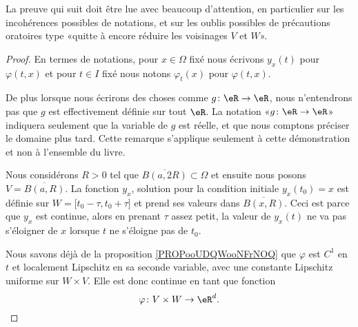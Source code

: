 \begin{probleme}
    La preuve qui suit doit être lue avec beaucoup d'attention, en particulier sur les incohérences possibles de notations, et sur les oublis possibles de précautions oratoires type «quitte à encore réduire les voisinages \( V\) et $W$».
\end{probleme}

\begin{proof}
    En termes de notations, pour \( x\in \Omega \) fixé nous écrivons \( y_x(t)\) pour \( \varphi(t,x)\) et pour \( t\in I\) fixé nous notons \( \varphi_t(x)\) pour \( \varphi(t,x)\).

    De plus lorsque nous écrirons des choses comme \( g\colon \eR\to \eR\), nous n'entendrons pas que \( g\) est effectivement définie sur tout \( \eR\). La notation «\( g\colon \eR\to \eR\)» indiquera seulement que la variable de \( g\) est réelle, et que nous comptons préciser le domaine plus tard. Cette remarque s'applique seulement à cette démonstration et non à l'ensemble du livre.

    Nous considérons \( R>0\) tel que \( \overline{ B(a,2R) }\subset\Omega\) et ensuite nous posons \( V=\overline{ B(a,R) }\). La fonction \( y_x\), solution pour la condition initiale \( y_x(t_0)=x\) est définie sur \( W=\mathopen[ t_0-\tau , t_0+\tau  \mathclose]\) et prend ses valeurs dans \( \overline{ B(x,R) }\). Ceci est parce que \( y_x\) est continue, alors en prenant \( \tau\) assez petit, la valeur de \( y_x(t)\) ne va pas s'éloigner de \( x\) lorsque \( t\) ne s'éloigne pas de \( t_0\).

    Nous savons déjà de la proposition \ref{PROPooUDQWooNFrNOQ} que \( \varphi\) est \( C^1\) en \( t\) et localement Lipschitz en sa seconde variable, avec une constante Lipschitz uniforme sur \( W\times V\). Elle est donc continue en tant que fonction
    \begin{equation}
        \varphi\colon V\times W\to \eR^d.
    \end{equation}
    

\end{proof}
